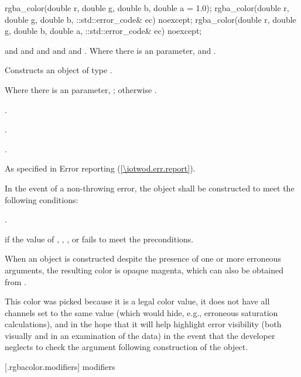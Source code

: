\begin{itemdecl}
	rgba_color(double r, double g, double b, double a = 1.0);
  	rgba_color(double r, double g, double b, ::std::error_code& ec) noexcept;
  	rgba_color(double r, double g, double b, double a, ::std::error_code& ec) noexcept;
\end{itemdecl}
\begin{itemdescr}
	\pnum
	\requires
	 and  and  and  and  and . Where there is an  parameter,  and .
	
	\pnum
	\effects
	Constructs an object of type .

	\pnum
	\postconditions
	Where there is an  parameter, ; otherwise .
	
	\pnum
	.
	
	\pnum
	.
	
	\pnum
	.
	
	\pnum
	\throws
	As specified in Error reporting (\ref{\iotwod.err.report}).
	
	\pnum
	\remarks
	In the event of a non-throwing error, the object shall be constructed to meet the following conditions:
	
	\pnum
	.
	
	\pnum
	\errors
	 if the value of , , , or  fails to meet the preconditions.
	
	\pnum
	\realnotes
	When an object is constructed despite the presence of one or more erroneous arguments, the resulting color is opaque magenta, which can also be obtained from .
	
	\pnum
	This color was picked because it is a legal color value, it does not have all channels set to the same value (which would hide, e.g., erroneous saturation calculations), and in the hope that it will help highlight error visibility (both visually and in an examination of the data) in the event that the developer neglects to check the  argument following construction of the object.
\end{itemdescr}

 [\iotwod.rgbacolor.modifiers]{ modifiers}

